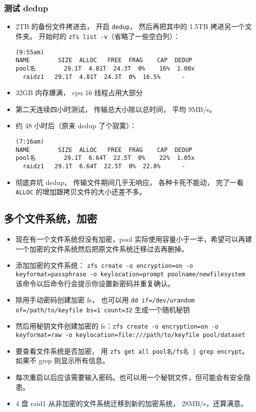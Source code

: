 \subsubsection{测试 dedup}
\begin{itemize}
\item 2TB 的备份文件拷进去， 开启 \verb|dedup|， 然后再把其中的 1.5TB 拷进另一个文件夹。 开始时的 \verb|zfs list -v|（省略了一些空白列）：
\begin{lstlisting}[language=none]
(9:55am)
NAME        SIZE  ALLOC   FREE  FRAG    CAP  DEDUP
pool名        29.1T  4.81T  24.3T  0%    16%  1.00x
  raidz1   29.1T  4.81T  24.3T  0%  16.5%      -
\end{lstlisting}
\item 32GB 内存爆满， cpu 16 线程占用大部分
\item 第二天连续四小时测试， 传输总大小除以总时间， 平均 9MB/s。
\item 约 48 小时后（原来 dedup 了个寂寞）：
\begin{lstlisting}[language=none]
(7:16am)
NAME        SIZE  ALLOC   FREE  FRAG    CAP  DEDUP 
pool名        29.1T  6.64T  22.5T  0%    22%  1.05x   
  raidz1   29.1T  6.64T  22.5T  0%  22.8%      - 
\end{lstlisting}
\item 彻底弃坑 dedup， 传输文件期间几乎无响应， 各种卡死不能动， 完了一看 \verb|ALLOC| 的增加跟拷贝文件的大小还差不多。
\end{itemize}

\subsection{多个文件系统，加密}
\begin{itemize}
\item 现在有一个文件系统但没有加密，pool 实际使用容量小于一半，希望可以再建一个加密的文件系统然后把原文件系统迁移过去再删掉。
\item 添加加密的文件系统： \verb`zfs create -o encryption=on -o keyformat=passphrase -o keylocation=prompt poolname/newfilesystem` 该命令以后命令行会提示你设置新密码并重复确认。
\item 除用手动密码创建加密 fs， 也可以用 \verb`dd if=/dev/urandom of=/path/to/keyfile bs=1 count=32` 生成一个随机秘钥
\item 然后用秘钥文件创建加密的 fs：\verb`zfs create -o encryption=on -o keyformat=raw -o keylocation=file:///path/to/keyfile pool/dataset`
\item 要查看文件系统是否加密， 用 \verb`zfs get all pool名/fs名 | grep encrypt`。 如果不 grep 则显示所有信息。
\item 每次重启以后应该需要输入密码。也可以用一个秘钥文件，但可能会有安全隐患。
\item 4 盘 raid1 从非加密的文件系统迁移到新的加密系统， 28MB/s，还算满意。
\end{itemize}
